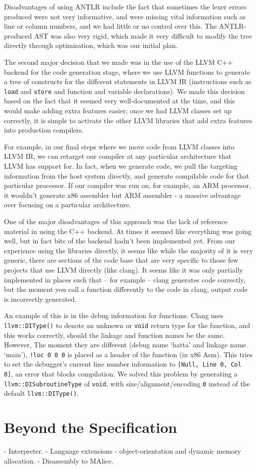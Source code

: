 \documentclass[a4wide, 11pt]{article}
\begin{document}
Disadvantages of using ANTLR include the fact that sometimes the lexer errors produced were not very informative, and were missing vital information such as line or column numbers, and we had little or no control over this. The ANTLR-produced AST was also very rigid, which made it very difficult to modify the tree directly through optimisation, which was our initial plan.

The second major decision that we made was in the use of the LLVM C++ backend for the code generation stage, where we use LLVM functions to generate a tree of constructs for the different statements in LLVM IR (instructions such as \texttt{load} and \texttt{store} and function and variable declarations). We made this decision based on the fact that it seemed very well-documented at the time, and this would make adding extra features easier; once we had LLVM classes set up correctly, it is simple to activate the other LLVM libraries that add extra features into production compilers.

For example, in our final steps where we move code from LLVM classes into LLVM IR, we can retarget our compiler at any particular architecture that LLVM has support for. In fact, when we generate code, we pull the targeting information from the host system directly, and generate compilable code for that particular processor. If our compiler was run on, for example, an ARM processor, it wouldn't generate x86 assembler but ARM assembler - a massive advantage over focusing on a particular architecture.

One of the major disadvantages of this approach was the lack of reference material in using the C++ backend. At times it seemed like everything was going well, but in fact bits of the backend hadn't been implemented yet. From our experience using the libraries directly, it seems like while the majority of it is very generic, there are sections of the code base that are very specific to those few projects that use LLVM directly (like clang). It seems like it was only partially implemented in places such that -- for example -- clang generates code correctly, but the moment you call a function differently to the code in clang, output code is incorrectly generated.

An example of this is in the debug information for functions. Clang uses \texttt{llvm::DIType()} to denote an unknown or \texttt{void} return type for the function, and this works correctly, should the linkage and function names be the same. However, The moment they are different (debug name `hatta' and linkage name `main'), \texttt{!loc 0 0 0} is placed as a header of the function (in x86 Asm). This tries to set the debugger's current line number information to \texttt{[Null, Line 0, Col 0]}, an error that blocks compilation. We solved this problem by generating a \texttt{llvm::DISubroutineType} of \texttt{void}, with size/alignment/encoding \texttt{0} instead of the default \texttt{llvm::DIType()}. 

\section{Beyond the Specification}

- Interpreter.
- Language extensions - object-orientation and dynamic memory allocation.
- Disassembly to MAlice. 
\end{document}
